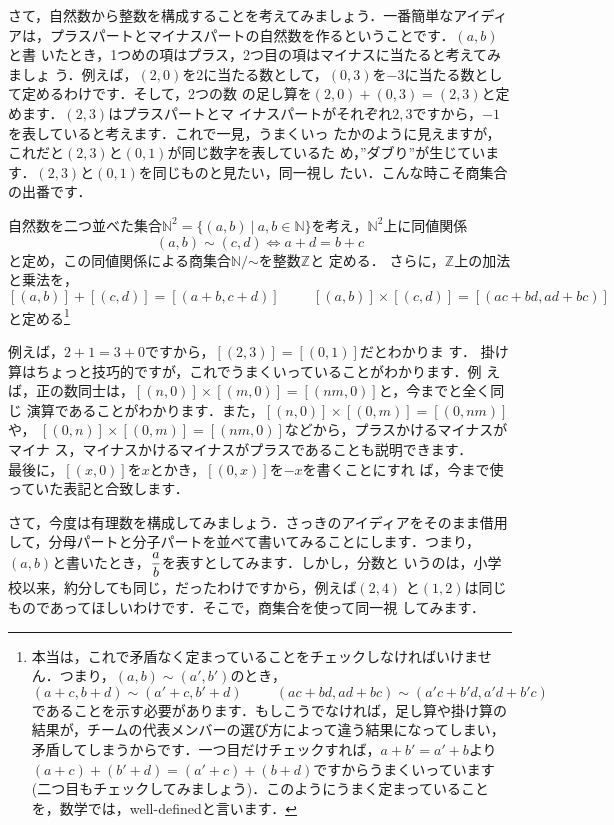 
さて，自然数から整数を構成することを考えてみましょう．一番簡単なアイディ
アは，プラスパートとマイナスパートの自然数を作るということです．$(a,b)$と書
いたとき，1つめの項はプラス，2つ目の項はマイナスに当たると考えてみましょ
う．例えば，$(2,0)$を$2$に当たる数として，$(0,3)$を$-3$に当たる数として定めるわけです．そして，2つの数
の足し算を$(2,0)+(0,3)=(2,3)$と定めます．$(2,3)$はプラスパートとマ
イナスパートがそれぞれ$2,3$ですから，$-1$を表していると考えます．これで一見，うまくいっ
たかのように見えますが，これだと$(2,3)$と$(0,1)$が同じ数字を表しているた
め，”ダブり”が生じています．$(2,3)$と$(0,1)$を同じものと見たい，同一視し
たい．こんな時こそ商集合の出番です．


\begin{defi}[整数]
 自然数を二つ並べた集合$\mathbb{N}^2=\{(a,b)\ |\ a,b\in
\mathbb{N}\}$を考え，$\mathbb{N}^2$上に同値関係
\[
 (a,b)\sim(c,d)\Leftrightarrow a+d=b+c
\]
と定め，この同値関係による商集合$\mathbb{N}/\mathord{\sim}$を整数$\mathbb{Z}$と
 定める．
 さらに，$\mathbb{Z}$上の加法と乗法を，
 \[
  [(a,b)]+[(c,d)]=[(a+b,c+d)]\hspace{1cm}[(a,b)]\times[(c,d)]=[(ac+bd,ad+bc)]
 \]
 と定める\footnote{本当は，これで矛盾なく定まっていることをチェックしなければいけません．つまり，$(a,b)\sim(a',b')$のとき，\[(a+c,b+d)\sim(a'+c,b'+d)\hspace{1cm}(ac+bd,ad+bc)\sim(a'c+b'd,a'd+b'c)\]であることを示す必要があります．もしこうでなければ，足し算や掛け算の結果が，チームの代表メンバーの選び方によって違う結果になってしまい，矛盾してしまうからです．一つ目だけチェックすれば，$a+b'=a'+b$より$(a+c)+(b'+d)=(a'+c)+(b+d)$ですからうまくいっています(二つ目もチェックしてみましょう)．このようにうまく定まっていることを，数学では，well-definedと言います．}
\end{defi}

例えば，$2+1=3+0$ですから，$[(2,3)]=[(0,1)]$だとわかりま
す．
掛け算はちょっと技巧的ですが，これでうまくいっていることがわかります．例
えば，正の数同士は，$[(n,0)]\times[(m,0)]=[(nm,0)] $と，今までと全く同じ
演算であることがわかります．また，$[(n,0)]\times[(0,m)]=[(0,nm)]$や，
$[(0,n)]\times[(0,m)]=[(nm,0)]$などから，プラスかけるマイナスがマイナ
ス，マイナスかけるマイナスがプラスであることも説明できます．\\
最後に，$[(x,0)]$を$x$とかき，$[(0,x)]$を$-x$を書くことにすれ
ば，今まで使っていた表記と合致します．



さて，今度は有理数を構成してみましょう．さっきのアイディアをそのまま借用
して，分母パートと分子パートを並べて書いてみることにします．つまり，
$(a,b)$と書いたとき，$\displaystyle\frac{a}{b}$を表すとしてみます．しかし，分数と
いうのは，小学校以来，約分しても同じ，だったわけですから，例えば$(2,4)$
と$(1,2)$は同じものであってほしいわけです．そこで，商集合を使って同一視
してみます．


